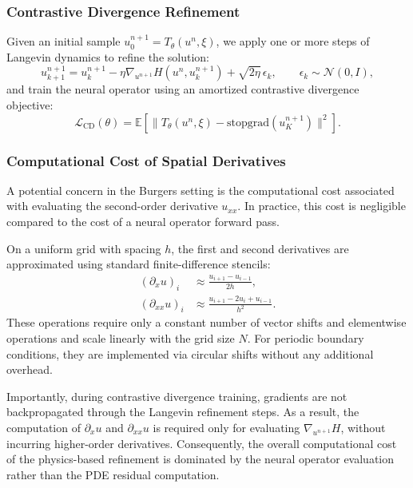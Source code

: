 \documentclass[11pt]{article}
\begin{document}
\subsubsection{Contrastive Divergence Refinement}

Given an initial sample \(u_0^{n+1} = T_\theta(u^n, \xi)\), we apply one or more steps of Langevin dynamics to refine the solution:
\begin{equation}
    u_{k+1}^{n+1}
    =
    u_k^{n+1}
    -
    \eta \nabla_{u^{n+1}} H(u^n, u_k^{n+1})
    +
    \sqrt{2\eta}\,\epsilon_k,
    \qquad \epsilon_k \sim \mathcal{N}(0,I),
\end{equation}
and train the neural operator using an amortized contrastive divergence objective:
\begin{equation}
    \mathcal{L}_{\mathrm{CD}}(\theta)
    =
    \mathbb{E}
    \left[
        \big\|
            T_\theta(u^n,\xi)
            -
            \mathrm{stopgrad}(u_K^{n+1})
        \big\|^2
    \right].
\end{equation}

\subsubsection{Computational Cost of Spatial Derivatives}

A potential concern in the Burgers setting is the computational cost associated with evaluating the second-order derivative \(u_{xx}\). In practice, this cost is negligible compared to the cost of a neural operator forward pass.

On a uniform grid with spacing \(h\), the first and second derivatives are approximated using standard finite-difference stencils:
\begin{align}
    (\partial_x u)_i
    &\approx \frac{u_{i+1} - u_{i-1}}{2h}, \\
    (\partial_{xx} u)_i
    &\approx \frac{u_{i+1} - 2u_i + u_{i-1}}{h^2}.
\end{align}
These operations require only a constant number of vector shifts and elementwise operations and scale linearly with the grid size \(N\). For periodic boundary conditions, they are implemented via circular shifts without any additional overhead.

Importantly, during contrastive divergence training, gradients are not backpropagated through the Langevin refinement steps. As a result, the computation of \(\partial_x u\) and \(\partial_{xx} u\) is required only for evaluating \(\nabla_{u^{n+1}} H\), without incurring higher-order derivatives. Consequently, the overall computational cost of the physics-based refinement is dominated by the neural operator evaluation rather than the PDE residual computation.
\end{document}
